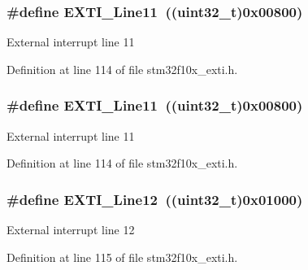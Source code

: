 \subsubsection[{\texorpdfstring{E\+X\+T\+I\+\_\+\+Line11}{EXTI_Line11}}]{\setlength{\rightskip}{0pt plus 5cm}\#define E\+X\+T\+I\+\_\+\+Line11~(({\bf uint32\+\_\+t})0x00800)}\hypertarget{group___e_x_t_i___lines_ga6157b34c53e9b5cb8ee0d7ac3f5ba292}{}\label{group___e_x_t_i___lines_ga6157b34c53e9b5cb8ee0d7ac3f5ba292}
External interrupt line 11 

Definition at line 114 of file stm32f10x\+\_\+exti.\+h.

\subsubsection[{\texorpdfstring{E\+X\+T\+I\+\_\+\+Line11}{EXTI_Line11}}]{\setlength{\rightskip}{0pt plus 5cm}\#define E\+X\+T\+I\+\_\+\+Line11~(({\bf uint32\+\_\+t})0x00800)}\hypertarget{group___e_x_t_i___lines_ga6157b34c53e9b5cb8ee0d7ac3f5ba292}{}\label{group___e_x_t_i___lines_ga6157b34c53e9b5cb8ee0d7ac3f5ba292}
External interrupt line 11 

Definition at line 114 of file stm32f10x\+\_\+exti.\+h.

\subsubsection[{\texorpdfstring{E\+X\+T\+I\+\_\+\+Line12}{EXTI_Line12}}]{\setlength{\rightskip}{0pt plus 5cm}\#define E\+X\+T\+I\+\_\+\+Line12~(({\bf uint32\+\_\+t})0x01000)}\hypertarget{group___e_x_t_i___lines_gab73a0a31f1814118955099b9dd3bdfef}{}\label{group___e_x_t_i___lines_gab73a0a31f1814118955099b9dd3bdfef}
External interrupt line 12 

Definition at line 115 of file stm32f10x\+\_\+exti.\+h.

